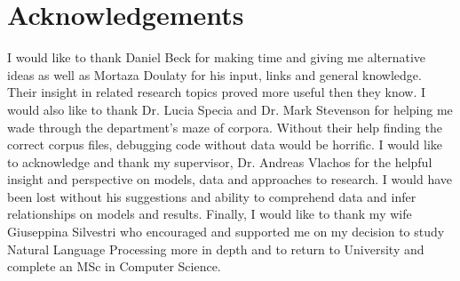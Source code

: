 \chapter*{Acknowledgements}

I would like to thank Daniel Beck for making time and giving me alternative ideas as well as Mortaza Doulaty for his input, links and general knowledge. Their insight in related research topics proved more useful then they know. I would also like to thank Dr. Lucia Specia and Dr. Mark Stevenson for helping me wade through the department's maze of corpora. Without their help finding the correct corpus files, debugging code without data would be horrific. I would like to acknowledge and thank my supervisor, Dr. Andreas Vlachos for the helpful insight and perspective on models, data and approaches to research. I would have been lost without his suggestions and ability to comprehend data and infer relationships on models and results. Finally, I would like to thank my wife Giuseppina Silvestri who encouraged and supported me on my decision to study Natural Language Processing more in depth and to return to University and complete an MSc in Computer Science.
